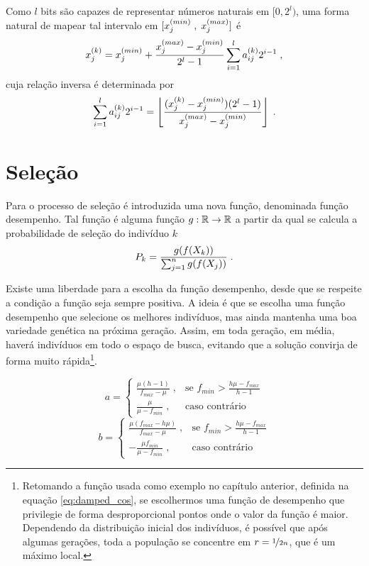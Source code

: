 Como $l$ bits são capazes de representar números naturais em $ [0, 2^l) $,
uma forma natural de mapear tal intervalo
em $ [ x^{(min)}_{j} \; , \; x^{(max)}_{j} ] $ é
\begin{equation}
  x^{(k)}_j = x^{(min)}_{j} + \frac{x^{(max)}_{j} - x^{(min)}_{j}}{2^l - 1} \sum_{i = 1}^l a^{(k)}_{ij} 2^{i - 1} \;\mathrm{,}
\end{equation}
cuja relação inversa é determinada por
\begin{equation}
  \sum_{i = 1}^l a^{(k)}_{ij} 2^{i - 1} =
  \left\lfloor \frac{(x^{(k)}_{j} - x^{(min)}_{j})(2^l - 1)}{x^{(max)}_{j} - x^{(min)}_{j}} \right\rfloor
  \;\mathrm{.}
\end{equation}

\newpage
\section{Seleção}

Para o processo de seleção é introduzida uma nova função, denominada função desempenho.
Tal função é alguma função $ g : \mathbb{R} \rightarrow \mathbb{R} $ a partir da qual se calcula a probabilidade
de seleção do indivíduo $k$
\begin{equation}
  P_k = \frac{g(f(X_k))}{\sum_{j = 1}^n g(f(X_j))} \;\mathrm{.}
\end{equation}

Existe uma liberdade para a escolha da função desempenho, desde que se respeite a condição a
função seja sempre positiva. A ideia é que se escolha uma função desempenho que
selecione os melhores indivíduos, mas ainda mantenha uma boa variedade genética na
próxima geração. Assim, em toda geração, em média, haverá indivíduos em todo o espaço
de busca, evitando que a solução convirja de forma muito rápida\footnote{
  Retomando a função usada como exemplo no capítulo anterior, definida na equação
  \ref{eq:damped_cos}, se escolhermos uma função de desempenho que privilegie
  de forma desproporcional pontos onde o valor da função é maior. Dependendo da
  distribuição inicial dos indivíduos, é possível que após algumas gerações,
  toda a população se concentre em $ r = \nicefrac{1}{2n} $, que é um
  máximo local.
}.

\newcommand{\fmin}{f_{min}}
\newcommand{\fmax}{f_{max}}

\begin{equation}
  a =
  \begin{cases}
    \frac{\mu (h - 1)}{\fmax - \mu} \;, & \text{se } \fmin > \frac{h\mu - \fmax}{h - 1} \\
    \frac{\mu}{\mu - \fmin}         \;, & \text{caso contrário}
  \end{cases}
  \label{eq:linear_fit_a}
\end{equation}
\begin{equation}
  b =
  \begin{cases}
    \frac{\mu (\fmax - h\mu)}{\fmax - \mu} \;, & \text{se } \fmin > \frac{h\mu - \fmax}{h - 1} \\
    - \frac{\mu\fmin}{\mu - \fmin}         \;, & \text{caso contrário}
  \end{cases}
  \label{eq:linear_fit_b}
\end{equation}

